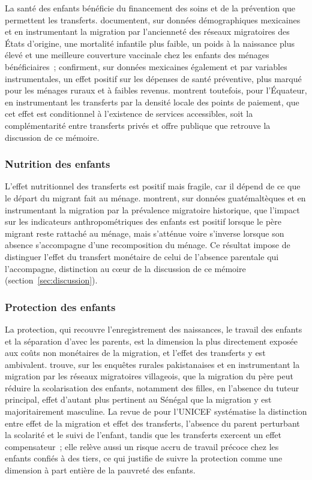 La santé des enfants bénéficie du financement des soins et de la
prévention que permettent les transferts. \textcite{hildebrandt2005}
documentent, sur données démographiques mexicaines et en instrumentant la
migration par l'ancienneté des réseaux migratoires des États d'origine, une
mortalité infantile plus faible, un poids à la naissance plus élevé et une
meilleure couverture vaccinale chez les enfants des ménages bénéficiaires~;
\textcite{amuedo2011} confirment, sur données mexicaines également et par
variables instrumentales, un effet positif sur les dépenses de santé
préventive, plus marqué pour les ménages ruraux et à faibles revenus.
\textcite{calero2009} montrent toutefois, pour l'Équateur, en instrumentant
les transferts par la densité locale des points de paiement, que cet effet
est conditionnel à l'existence de services accessibles, soit la complémentarité entre transferts privés et
offre publique que retrouve la discussion de ce mémoire.

\subsubsection{Nutrition des enfants}

L'effet nutritionnel des transferts est positif mais fragile, car il
dépend de ce que le départ du migrant fait au ménage. \textcite{davis2016}
montrent, sur données guatémaltèques et en instrumentant la migration par la
prévalence migratoire historique, que l'impact sur les indicateurs
anthropométriques des enfants est positif lorsque le père migrant reste
rattaché au ménage, mais s'atténue voire s'inverse lorsque son absence
s'accompagne d'une recomposition du ménage. Ce résultat impose de distinguer
l'effet du transfert monétaire de celui de l'absence parentale qui
l'accompagne, distinction au cœur de la discussion de ce mémoire
(section~\ref{sec:discussion}).

\subsubsection{Protection des enfants}

La protection, qui recouvre l'enregistrement des naissances, le travail des
enfants et la séparation d'avec les parents, est la dimension la plus directement
exposée aux coûts non monétaires de la migration, et l'effet des transferts
y est ambivalent. \textcite{mansuri2006} trouve, sur les enquêtes rurales
pakistanaises et en instrumentant la migration par les réseaux migratoires
villageois, que la migration du père peut réduire la scolarisation des
enfants, notamment des filles, en l'absence du tuteur principal, effet d'autant plus pertinent au
Sénégal que la migration y est majoritairement masculine. La revue de
\textcite{cortes2007} pour l'UNICEF systématise la distinction entre effet
de la migration et effet des transferts, l'absence du parent perturbant la
scolarité et le suivi de l'enfant, tandis que les transferts exercent un
effet compensateur~; elle relève aussi un risque accru de travail précoce
chez les enfants confiés à des tiers, ce qui justifie de suivre la
protection comme une dimension à part entière de la pauvreté des enfants.

